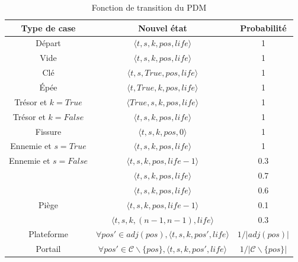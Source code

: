 \documentclass[a4paper]{article}
\theoremstyle{plain}
\begin{document}
\begin{table}
	\centering
	\begin{tabular}{c|c|c}
		\textbf{Type de case} & \textbf{Nouvel état} & \textbf{Probabilité}\\
		\hline
		Départ & $\langle t, s, k, pos, life \rangle$ & 1 \\
		\hline
		Vide & $\langle t, s, k, pos, life \rangle$ & 1\\
		\hline
		Clé & $\langle t, s, True, pos, life \rangle$ & 1 \\
		\hline
		Épée & $\langle t, True, k, pos, life \rangle$ & 1 \\
		\hline
		Trésor et $k = True$ & $\langle True, s, k, pos, life \rangle$ & 1 \\
		\hline
		Trésor et $k = False$ & $\langle t, s, k, pos, life \rangle$ & 1 \\
		\hline
		Fissure & $\langle t, s, k, pos, 0 \rangle$ & 1 \\
		\hline
		Ennemie et $s = True$ & $\langle t, s, k, pos, life \rangle$ & 1 \\
		\hline
		Ennemie et $s = False$ & $\langle t, s, k, pos, life - 1 \rangle$ & 0.3 \\
		& $\langle t, s, k, pos, life \rangle$ & 0.7 \\
		\hline
		& $\langle t, s, k, pos, life \rangle$ & 0.6 \\
		Piège & $\langle t, s, k, pos, life - 1 \rangle$ & 0.1\\
		& $\langle t, s, k, (n - 1, n - 1), life \rangle$ & 0.3 \\
		\hline
		Plateforme & $\forall pos' \in adj(pos), \langle t, s, k, pos', life \rangle$ & $1 / |adj(pos)|$ \\
		\hline
		Portail & $\forall pos' \in \mathcal{C}\backslash\{pos\}, \langle t, s, k, pos', life \rangle$ & $1 / |\mathcal{C}\backslash\{pos\}|$
	\end{tabular}
	\caption{Fonction de transition du PDM}
	\label{tab:transition}
\end{table}
\end{document}
